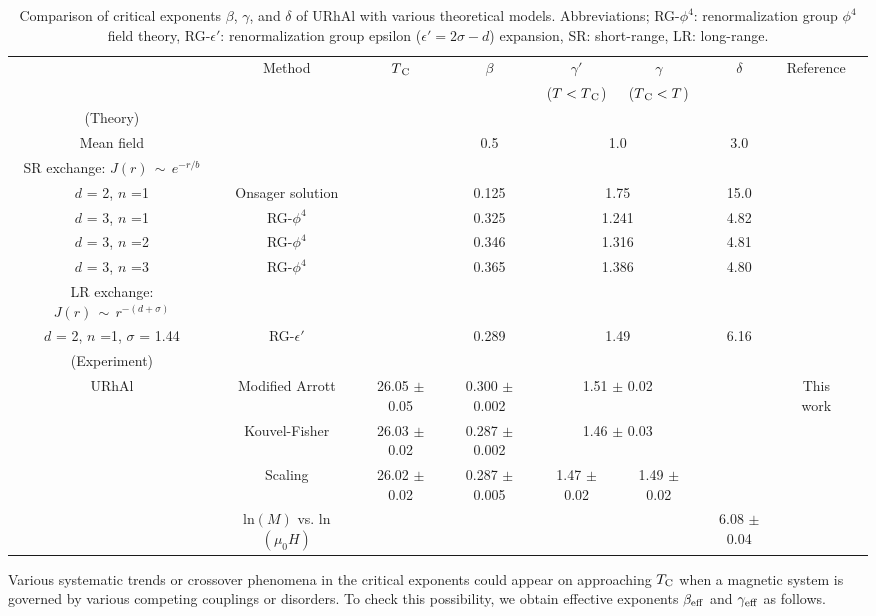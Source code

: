 \documentclass[twocolumn,showpacs,preprintnumbers,amsmath,amssymb]{revtex4}
\begin{document}
     \begin{table*}[]%
\caption{\label{tab:table1}%
Comparison of critical exponents $\beta$, $\gamma$, and $\delta$ of URhAl with various theoretical models. Abbreviations; RG-${\phi}^4$: renormalization group ${\phi}^4$ field theory,  RG-${\epsilon}'$: renormalization group epsilon (${\epsilon}'=2{\sigma}-d$) expansion, SR: short-range, LR: long-range.}
\begin{ruledtabular}
\begin{tabular}{ccccccccc}%
\textrm{}&
\textrm{Method}&
\textrm{$T{_{\rm C}}$}&
\textrm{$\beta$ }&
\textrm{${\gamma}'$}&
\textrm{${\gamma}$}&
\textrm{$\delta$}&
\textrm{Reference}&\\
\textrm{}&
\textrm{}&
\textrm{}&
\textrm{}&
\textrm{($T<T{_{\rm C}}$)}&
\textrm{($T{_{\rm C}}<T$)}&
\textrm{}&
\textrm{}&\\
\colrule
(Theory)&&&&&&&&\\ 
Mean field &&&0.5&\multicolumn{2}{c}{1.0}&3.0&&\\ 
SR exchange: $J(r){\,}{\sim}{\,}e^{-r/b}$ &&&&&&&&\\ 
$d$ =  2, $n$ =1 &Onsager solution&&0.125&\multicolumn{2}{c}{1.75}&15.0&\cite{privman,fischer1}&\\ 
$d$ =  3, $n$ =1 &RG-${\phi}^4$&&0.325&\multicolumn{2}{c}{1.241}&4.82&\cite{privman,guillou}&\\ 
$d$ =  3, $n$ =2 &RG-${\phi}^4$&&0.346&\multicolumn{2}{c}{1.316}&4.81&\cite{privman,guillou}&\\ 
$d$ =  3, $n$ =3 &RG-${\phi}^4$&&0.365&\multicolumn{2}{c}{1.386}&4.80&\cite{privman,guillou}&\\ 
LR exchange: $J(r){\,}{\sim}{\,}r^{-(d+{\sigma})}$ &&&&&&&&\\ 
$d$ =  2, $n$ =1, $\sigma$ = 1.44  &RG-${\epsilon}'$&&0.289&\multicolumn{2}{c}{1.49}&6.16&\cite{fischer1}&\\ 
\colrule

(Experiment)&&&&&&&&\\ 
URhAl&Modified Arrott &26.05 $\pm$ 0.05  &0.300 $\pm$ 0.002 &  \multicolumn{2}{c}{1.51 $\pm$ 0.02} &&This work&\\ 
&Kouvel-Fisher &26.03  $\pm$ 0.02  &0.287 $\pm$ 0.002 &  \multicolumn{2}{c}{1.46 $\pm$ 0.03}  &&&\\
&Scaling &26.02  $\pm$ 0.02  &0.287 $\pm$ 0.005& 1.47 $\pm$ 0.02 & 1.49 $\pm$ 0.02 &&& \\
&ln$(M)$ vs. ln${({{\mu}_0}H)}$ &  & & && 6.08 $\pm$ 0.04 && \\
\end{tabular}
\end{ruledtabular}
 \end{table*}
 Various systematic trends or crossover phenomena in the critical exponents could appear on approaching $T_{\rm C}$ when a magnetic system is governed by various competing couplings or disorders. To check this possibility, we obtain effective exponents ${\beta}_{\rm eff}$ and ${\gamma}_{\rm eff}$ as follows. 
\end{document}
